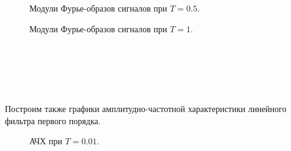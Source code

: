 \documentclass[a5paper, 10pt]{article}
\theoremstyle{definition}
\theoremstyle{plain}
\theoremstyle{remark}
\begin{document}
\begin{figure}[h!]
\caption{Модули Фурье-образов сигналов при $T = 0.5$.}
\caption{Модули Фурье-образов сигналов при $T = 1$.}
\end{figure}
\, \\
\\
\\
\\
\\
Построим также графики амплитудно-частотной характеристики линейного фильтра первого порядка.
\begin{figure}[h!]
\caption{АЧХ при $T = 0.01$.}
\end{figure}
\end{document}
